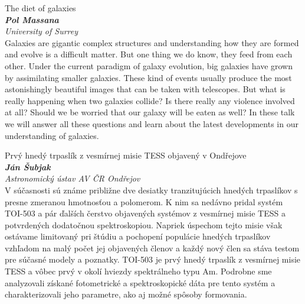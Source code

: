 \documentclass[a4paper]{report}
\begin{document}
                    \begin{tcolorbox}[
                                    colback=white,
                    colframe=black!70!white,
                                fonttitle=\Large\bfseries,
                title=16:00
            ]
                {\Large The diet of galaxies}
                                                            \\ \textbf{\textit{Pol Massana}}
                                                    \\ \textit{University of Surrey}                \\[2ex]Galaxies are gigantic complex structures and understanding how they are formed and evolve is a difficult matter. But one thing we do know, they feed from each other. Under the current paradigm of galaxy evolution, big galaxies have grown by assimilating smaller galaxies. These kind of events usually produce the most astonishingly beautiful images that can be taken with telescopes. But what is really happening when two galaxies collide? Is there really any violence involved at all? Should we be worried that our galaxy will be eaten as well? In these talk we will answer all these questions and learn about the latest developments in our understanding of galaxies.
            \end{tcolorbox}
                    \begin{tcolorbox}[
                                    colback=white,
                    colframe=black!70!white,
                                fonttitle=\Large\bfseries,
                title=16:30
            ]
                {\Large Prvý hnedý trpaslík z vesmírnej misie TESS objavený v Ondřejove}
                                                            \\ \textbf{\textit{Ján Šubjak}}
                                                    \\ \textit{Astronomický ústav AV ČR Ondřejov}                \\[2ex]V súčasnosti sú známe približne dve desiatky tranzitujúcich hnedých trpaslíkov s presne zmeranou hmotnosťou a polomerom. K nim sa nedávno pridal systém TOI-503 a pár ďalších čerstvo objavených systémov z vesmírnej misie TESS a potvrdených dodatočnou spektroskopiou. Napriek úspechom tejto misie však ostávame limitovaný pri štúdiu a pochopení populácie hnedých trpaslíkov vzhľadom na malý počet jej objavených členov a každý nový člen sa stáva testom pre súčasné modely a poznatky. TOI-503 je prvý hnedý trpaslík z vesmírnej misie TESS a vôbec prvý v okolí hviezdy spektrálneho typu Am. Podrobne sme analyzovali získané fotometrické a spektroskopické dáta pre tento systém a charakterizovali jeho parametre, ako aj možné spôsoby formovania.
            \end{tcolorbox}
\end{document}
